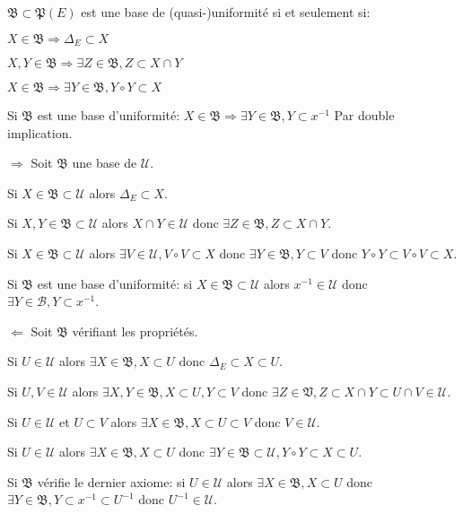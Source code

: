 \documentclass[a4paper, 11pt, french]{book}
\newenvironment{itemise}{\itemize}{\enditemize}
\theoremstyle{plain} %
\theoremstyle{definition} %
\theoremstyle{remark} %
\newcommand{\1}{\mathds{1}}
\newcommand{\inv}[1]{#1^{-1}}
\begin{document}
\proposition
$\mathfrak{B}\subset\mathfrak{P}(E)$ est une base de (quasi-)uniformité si et seulement si:
\begin{itemise}
	\item $X\in\mathfrak{B}\Rightarrow\Delta_E\subset X$
	\item $X, Y\in\mathfrak{B}\Rightarrow\exists Z\in\mathfrak{B}, Z\subset X\cap Y$
	\item $X\in\mathfrak{B}\Rightarrow\exists Y\in\mathfrak{B}, Y\circ Y\subset X$
	\item Si $\mathfrak{B}$ est une base d'uniformité: $X\in\mathfrak{B}\Rightarrow\exists Y\in\mathfrak{B}, Y\subset x^{-1}$
\end{itemise}
\demonstration
Par double implication.
\begin{itemise}
	\item[$\Rightarrow$] Soit $\mathfrak{B}$ une base de $\mathscr{U}$.
	\begin{itemise}
		\item Si $X\in\mathfrak{B}\subset\mathscr{U}$ alors $\Delta_E\subset X$.
		\item Si $X, Y\in\mathfrak{B}\subset\mathscr{U}$ alors $X\cap Y\in\mathscr{U}$ donc $\exists Z\in\mathfrak{B}, Z\subset X\cap Y$.
		\item Si $X\in\mathfrak{B}\subset\mathscr{U}$ alors $\exists V\in\mathscr{U}, V\circ V\subset X$ donc $\exists Y\in\mathfrak{B}, Y\subset V$ donc $Y\circ Y\subset V\circ V\subset X$.
		\item Si $\mathfrak{B}$ est une base d'uniformité: si $X\in\mathfrak{B}\subset\mathscr{U}$ alors $ x^{-1}\in\mathscr{U}$ donc $\exists Y\in\mathscr{B}, Y\subset x^{-1}$.
	\end{itemise}
	\item[$\Leftarrow$] Soit $\mathfrak{B}$ vérifiant les propriétés.
	\begin{itemise}
		\item Si $U\in\mathscr{U}$ alors $\exists X\in\mathfrak{B}, X\subset U$ donc $\Delta_E\subset X\subset U$.
		\item Si $U, V\in\mathscr{U}$ alors $\exists X, Y\in\mathfrak{B}, X\subset U, Y\subset V$ donc $\exists Z\in\mathfrak{V}, Z\subset X\cap Y\subset U\cap V\in\mathscr{U}$.
		\item Si $U\in\mathscr{U}$ et $U\subset V$ alors $\exists X\in\mathfrak{B}, X\subset U\subset V$ donc $V\in\mathscr{U}$.
		\item Si $U\in\mathscr{U}$ alors $\exists X\in\mathfrak{B}, X\subset U$ donc $\exists Y\in\mathfrak{B}\subset\mathscr{U}, Y\circ Y\subset X\subset U$.
		\item Si $\mathfrak{B}$ vérifie le dernier axiome: si $U\in\mathscr{U}$ alors $\exists X\in\mathfrak{B}, X\subset U$ donc $\exists Y\in\mathfrak{B}, Y\subset x^{-1}\subset\inv{U}$ donc $\inv{U}\in\mathscr{U}$.
	\end{itemise}
\end{itemise}
\end{document}

